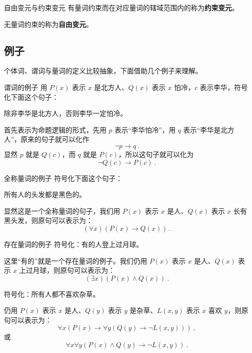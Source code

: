 \begin{definition}{自由变元与约束变元}
有量词约束而在对应量词的辖域范围内的称为\textbf{约束变元}。

无量词约束的称为\textbf{自由变元}。
\end{definition}


\subsection{例子}
个体词、谓词与量词的定义比较抽象，下面借助几个例子来理解。

\begin{example}{谓词的例子}
用 $P(x)$ 表示 $x$ 是北方人、$Q(x)$ 表示 $x$ 怕冷，$c$ 表示李华，符号化下面这个句子：

除非李华是北方人，否则李华一定怕冷。
\end{example}
首先表示为命题逻辑的形式，先用 $p$ 表示“李华怕冷”，用 $q$ 表示“李华是北方人”，原来的句子就可以化作
\begin{equation}
\neg p \to  q ~.
\end{equation}
显然 $p$ 就是 $Q(c)$，而 $q$ 就是 $P(c)$，所以这句子就可以化为
\begin{equation}
\neg Q(c) \to  P(c) ~.
\end{equation}

\begin{example}{全称量词的例子}
符号化下面这个句子：

所有人的头发都是黑色的。
\end{example}
显然这是一个全称量词的句子，我们用 $P(x)$ 表示 $x$ 是人、$Q(x)$ 表示 $x$ 长有黑头发，则原句可以表示为：
\begin{equation}
(\forall x)(P(x) \to Q(x)) ~.
\end{equation}

\begin{example}{存在量词的例子}
符号化：有的人登上过月球。
\end{example}
这里“有的”就是一个存在量词的例子。我们仍用 $P(x)$ 表示 $x$ 是人、$Q(x)$ 表示 $x$ 上过月球，则原句可以表示为：
\begin{equation}
(\exists x)(P(x) \land Q(x)) ~.
\end{equation}

\begin{example}{}
符号化：所有人都不喜欢杂草。
\end{example}
仍用 $P(x)$ 表示 $x$ 是人、$Q(y)$ 表示 $y$ 是杂草、$L(x, y)$ 表示 $x$ 喜欢 $y$，则原句可以表示为：
\begin{equation}
\forall x(P(x) \to \forall y(Q(y) \to \neg L(x, y))) ~,
\end{equation}
或
\begin{equation}
\forall x \forall y (P(x) \land Q(y) \to \neg L(x, y)) ~.
\end{equation}






